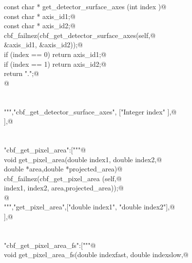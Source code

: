 \documentclass[10pt,a4paper,twoside,notitlepage]{article}
\begin{document}
\begin{flushleft}
\begin{list}{}{}
\mbox{}\verb@   const char * get_detector_surface_axes (int index ){@\\
\mbox{}\verb@       const char * axis_id1;@\\
\mbox{}\verb@       const char * axis_id2;@\\
\mbox{}\verb@       cbf_failnez(cbf_get_detector_surface_axes(self,@\\
\mbox{}\verb@                                    &axis_id1, &axis_id2));@\\
\mbox{}\verb@       if (index == 0) return axis_id1;@\\
\mbox{}\verb@       if (index == 1) return axis_id2;@\\
\mbox{}\verb@       return ".";@\\
\mbox{}\verb@   }@\\
\mbox{}\verb@@\\
\mbox{}\verb@@\\
\mbox{}\verb@""","cbf_get_detector_surface_axes", ["Integer index" ],@\\
\mbox{}\verb@ ["String" ] ],@\\
\mbox{}\verb@@\\
\mbox{}\verb@@\\
\mbox{}\verb@"cbf_get_pixel_area":["""@\\
\mbox{}\verb@%apply double *OUTPUT{double *area,double *projected_area};@\\
\mbox{}\verb@    void get_pixel_area(double index1, double index2,@\\
\mbox{}\verb@                        double *area,double *projected_area){@\\
\mbox{}\verb@       cbf_failnez(cbf_get_pixel_area (self,@\\
\mbox{}\verb@                                       index1, index2, area,projected_area));@\\
\mbox{}\verb@      }@\\
\mbox{}\verb@""","get_pixel_area",["double index1", "double index2"],@\\
\mbox{} ],@\\
\mbox{}\verb@@\\
\mbox{}\verb@@\\
\mbox{}\verb@"cbf_get_pixel_area_fs":["""@\\
\mbox{}\verb@%apply double *OUTPUT{double *area,double *projected_area};@\\
\mbox{}\verb@    void get_pixel_area_fs(double indexfast, double indexslow,@\\

\end{list}
\end{flushleft}
\end{document}
